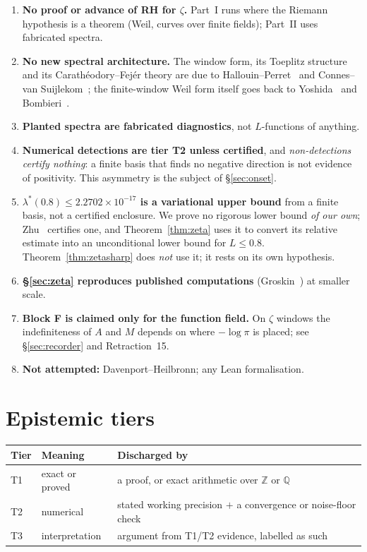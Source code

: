 \documentclass[11pt,a4paper]{article}
\theoremstyle{definition}
\theoremstyle{remark}
\newcommand{\lstar}{\lambda^{*}}
\begin{document}
\begin{enumerate}\itemsep2pt
\item \textbf{No proof or advance of RH for $\zeta$.} Part~I runs where the Riemann
hypothesis is a theorem (Weil, curves over finite fields); Part~II uses fabricated spectra.
\item \textbf{No new spectral architecture.} The window form, its Toeplitz structure and
its Carath\'eodory--Fej\'er theory are due to Hallouin--Perret~\cite{HP19} and
Connes--van Suijlekom~\cite{CvS}; the finite-window Weil form itself goes back to
Yoshida~\cite{Yoshida} and Bombieri~\cite{Bombieri}.
\item \textbf{Planted spectra are fabricated diagnostics}, not $L$-functions of anything.
\item \textbf{Numerical detections are tier T2 unless certified}, and
\emph{non-detections certify nothing}: a finite basis that finds no negative direction is
not evidence of positivity. This asymmetry is the subject of \S\ref{sec:onset}.
\item \textbf{$\lstar(0.8)\le 2.2702\times10^{-17}$ is a variational upper bound} from a
finite basis, not a certified enclosure. We prove no rigorous lower bound \emph{of our own};
Zhu~\cite{Zhu} certifies one, and Theorem~\ref{thm:zeta} uses it to convert its relative
estimate into an unconditional lower bound for $L\le0.8$. Theorem~\ref{thm:zetasharp} does
\emph{not} use it; it rests on its own hypothesis.
\item \textbf{\S\ref{sec:zeta} reproduces published computations} (Groskin~\cite{Groskin1})
at smaller scale.
\item \textbf{Block F is claimed only for the function field.} On $\zeta$ windows the
indefiniteness of $A$ and $M$ depends on where $-\log\pi$ is placed; see
\S\ref{sec:recorder} and Retraction~15.
\item \textbf{Not attempted:} Davenport--Heilbronn; any Lean formalisation.
\end{enumerate}

\section*{Epistemic tiers}

\begin{center}
\begin{tabular}{@{}lll@{}}
\toprule
Tier & Meaning & Discharged by \\
\midrule
T1 & exact or proved & a proof, or exact arithmetic over $\mathbb{Z}$ or $\mathbb{Q}$ \\
T2 & numerical & stated working precision $+$ a convergence or noise-floor check \\
T3 & interpretation & argument from T1/T2 evidence, labelled as such \\
\bottomrule
\end{tabular}
\end{center}
\end{document}
